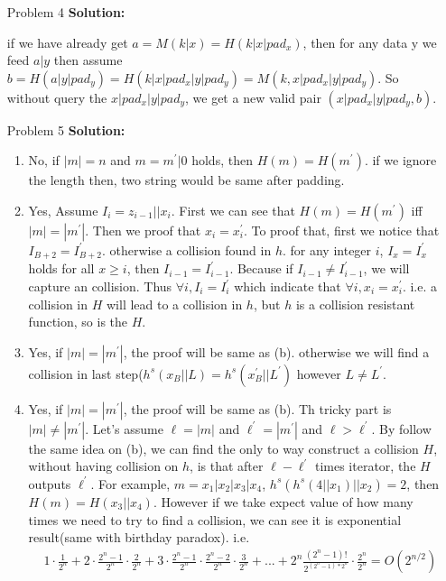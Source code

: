 \normalfont\documentclass[letterpaper,11pt]{article}
\begin{document}
\begin{enumerate}
\begin{enumerate}
	\end{enumerate}
\item [Problem 4]\textbf{Solution:}\par
	if we have already get $a = M(k|x) = H(k|x|pad_x)$, then for any data y we feed $a|y$ then assume $b = H(a|y|pad_y) = H(k|x|pad_x|y|pad_y) = M(k,x|pad_x|y|pad_y)$. So without query the $x|pad_x|y|pad_y$, we get a new valid pair $(x|pad_x|y|pad_y, b)$.
\item [Problem 5]\textbf{Solution:}\par
	\begin{enumerate}
		\item No, if $|m| = n$ and $m = m^\prime|0$ holds, then $H(m) = H(m^\prime)$. if we ignore the length then, two string would be same after padding.
		\item Yes, Assume $I_i = z_{i-1}||x_i$. First we can see that $H(m) = H(m^\prime)$ iff $|m| = |m^\prime|$.
		Then we proof that $x_i = x_i^\prime$. To proof that, first we notice that $I_{B+2} = I_{B+2}^\prime$.
		otherwise a collision found in $h$. for any integer $i$, $I_{x} = I_{x}^\prime$ holds for all $x \ge i$, then $I_{i - 1} = I_{i - 1}^\prime$. Because if $I_{i - 1} \neq I_{i - 1}^\prime$, we will capture an collision. Thus $\forall i, I_{i} = I_{i}^\prime$ which indicate that $\forall i, x_{i} = x_{i}^\prime$. i.e. a collision in $H$ will lead to a collision in $h$, but $h$ is a collision resistant function, so is the $H$.
		\item Yes, if $|m| = |m^\prime|$, the proof will be same as (b). otherwise we will find a collision in last step($h^s(x_B||L) = h^s(x_B^\prime||L^\prime)$ however $L \neq L^\prime$.
		\item Yes, if $|m| = |m^\prime|$, the proof will be same as (b). Th tricky part is $|m| \neq |m^\prime|$. Let's assume $\ell = |m|$ and $ \ell ^\prime= |m^\prime|$ and $\ell > \ell ^\prime$. By follow the same idea on (b), we can find the only to way construct a collision $H$, without having collision on $h$, is that after $\ell- \ell ^\prime$ times iterator, the $H$ outputs $\ell ^\prime$. For example, $m = x_1|x_2|x_3|x_4$, $h^s(h^s(4||x_1)||x_2) = 2$, then $H(m) = H(x_3||x_4)$. However if we take expect value of how many times we need to try to find a collision, we can see it is exponential result(same with birthday paradox). i.e.
		\begin{align*}
			&1\cdot \frac{1}{2^n} + 2 \cdot \frac{2^n-1}{2^n} \cdot \frac{2}{2^n} + 3 \cdot \frac{2^n-1}{2^n} \cdot\frac{2^n-2}{2^n} \cdot \frac{3}{2^n} +...+2^n\frac{(2^n-1)!}{2^{(2^n-1)*2^n}}\cdot \frac{2^{n}}{2^{n}} = O(2^{n/2})
		\end{align*}
	\end{enumerate}
\end{enumerate}
\end{document}

